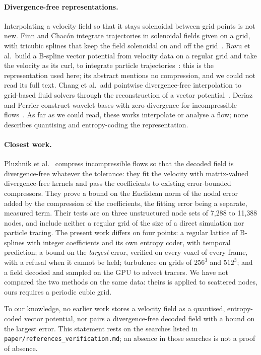 \documentclass[11pt,a4paper]{article}
\begin{document}
\paragraph{Divergence-free representations.}
Interpolating a velocity field so that it stays solenoidal between grid points is not new. Finn and Chac\'on integrate
trajectories in solenoidal fields given on a grid, with tricubic splines that keep the field solenoidal on and off the
grid~\cite{finn2005volume}. Ravu et al.\ build a B-spline vector potential from velocity data on a regular grid and take
the velocity as its curl, to integrate particle trajectories~\cite{ravu2016creating}: this is the representation used
here; its abstract mentions no compression, and we could not read its full text. Chang et al.\ add pointwise
divergence-free interpolation to grid-based fluid solvers through the reconstruction of a vector
potential~\cite{chang2022curl}. Deriaz and Perrier construct wavelet bases with zero divergence for incompressible
flows~\cite{deriaz2006divergence}. As far as we could read, these works interpolate or analyse a flow; none describes
quantising and entropy-coding the representation.

\paragraph{Closest work.}
Pluzhnik et al.~\cite{pluzhnik2026property} compress incompressible flows so that the decoded field is divergence-free
whatever the tolerance: they fit the velocity with matrix-valued divergence-free kernels and pass the coefficients to
existing error-bounded compressors. They prove a bound on the Euclidean norm of the nodal error added by the
compression of the coefficients, the fitting error being a separate, measured term. Their tests are on three
unstructured node sets of 7,288 to 11,388 nodes, and include neither a regular grid of the size of a direct
simulation nor particle tracing. The present work differs on four points: a regular lattice of B-splines with integer
coefficients and its own entropy coder, with temporal prediction; a bound on the \emph{largest} error, verified on every
voxel of every frame, with a refusal when it cannot be held; turbulence on grids of $256^3$ and $512^3$; and a field
decoded and sampled on the GPU to advect tracers. We have not compared the two methods on the same data: theirs is
applied to scattered nodes, ours requires a periodic cubic grid.

To our knowledge, no earlier work stores a velocity field as a quantised, entropy-coded vector potential, nor pairs a
divergence-free decoded field with a bound on the largest error. This statement rests on the searches listed in
\texttt{paper/references\_verification.md}; an absence in those searches is not a proof of absence.
\end{document}
